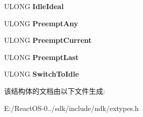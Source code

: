 \begin{DoxyCompactItemize}
U\+L\+O\+NG {\bfseries Idle\+Ideal}
\item 
\mbox{\label{struct___s_y_s_t_e_m___c_o_n_t_e_x_t___s_w_i_t_c_h___i_n_f_o_r_m_a_t_i_o_n_ae519b1fc48570ead581f48b1bf16a010}} 
U\+L\+O\+NG {\bfseries Preempt\+Any}
\item 
\mbox{\label{struct___s_y_s_t_e_m___c_o_n_t_e_x_t___s_w_i_t_c_h___i_n_f_o_r_m_a_t_i_o_n_a22a465dc7e38b076e2ca1198cbcd57f0}} 
U\+L\+O\+NG {\bfseries Preempt\+Current}
\item 
\mbox{\label{struct___s_y_s_t_e_m___c_o_n_t_e_x_t___s_w_i_t_c_h___i_n_f_o_r_m_a_t_i_o_n_a172348e938ff77835d9612ddd4d30455}} 
U\+L\+O\+NG {\bfseries Preempt\+Last}
\item 
\mbox{\label{struct___s_y_s_t_e_m___c_o_n_t_e_x_t___s_w_i_t_c_h___i_n_f_o_r_m_a_t_i_o_n_a1aedcf5b418f1951f4b1b31bd1abe2b3}} 
U\+L\+O\+NG {\bfseries Switch\+To\+Idle}
\end{DoxyCompactItemize}


该结构体的文档由以下文件生成\+:\begin{DoxyCompactItemize}
\item 
E\+:/\+React\+O\+S-\/0../sdk/include/ndk/extypes.\+h\end{DoxyCompactItemize}
